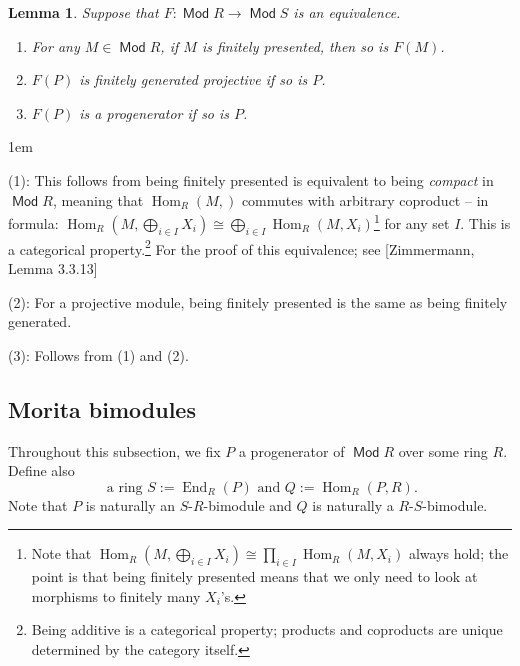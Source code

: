 \documentclass[11pt,a4paper]{article}
\makeatletter
\numberwithin{equation}{section}
\renewenvironment{proof}[1][\proofname]{\par
    \pushQED{\qed}%
    \normalfont \topsep0\p@\@plus6\p@ \labelsep1em\relax
    \trivlist
    \item[\hskip\labelsep\indent
        \bfseries #1]\ignorespaces
    \mbox{}
}{
    \popQED\endtrivlist\@endpefalse
}
\theoremstyle{all}
\newtheorem{lemma}[theorem]{Lemma}
\theoremstyle{remark}
\newcommand{\Hom}{\operatorname{Hom}\nolimits}
\newcommand{\End}{\operatorname{End}\nolimits}
\DeclareMathOperator{\Mod}{\mathsf{Mod}}
\newcommand{\defn}[1]{\textsl{\color{darkblue} #1}}
\makeatother
\begin{document}
\begin{lemma}\label{lem:progen is categorical}
Suppose that $F:\Mod R\to \Mod S$ is an equivalence.
\begin{enumerate}
\item For any $M\in \Mod R$, if $M$ is finitely presented, then so is $F(M)$.

\item $F(P)$ is finitely generated projective if so is $P$.

\item $F(P)$ is a progenerator if so is $P$.
\end{enumerate}
\end{lemma}
\begin{proof}
(1): This follows from being finitely presented is equivalent to being \defn{compact} in $\Mod R$, meaning that $\Hom_R(M,)$ commutes with arbitrary coproduct -- in formula: $\Hom_R(M, \bigoplus_{i\in I}X_i) \cong \bigoplus_{i\in I} \Hom_R(M,X_i)$\footnote{Note that $\Hom_R(M, \bigoplus_{i\in I}X_i)\cong \prod_{i\in I}\Hom_R(M,X_i)$ always hold; the point is that being finitely presented means that we only need to look at morphisms to finitely many $X_i$'s.} for any set $I$.  This is a categorical property.\footnote{Being additive is a categorical property; products and coproducts are unique determined by the category itself.} For the proof of this equivalence; see [Zimmermann, Lemma 3.3.13]

(2): For a projective module, being finitely presented is the same as being finitely generated.

(3): Follows from (1) and (2).
\end{proof}


\subsection{Morita bimodules}

Throughout this subsection, we fix $P$ a progenerator of $\Mod R$ over some ring $R$.  Define also
\[
\text{ a ring } S:=\End_R(P) \text{ and } Q:=\Hom_R(P,R).
\]
Note that $P$ is naturally an $S$-$R$-bimodule and $Q$ is naturally a $R$-$S$-bimodule.
\end{document}
